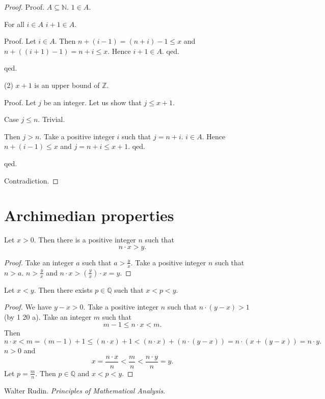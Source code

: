 \documentclass{article}
\begin{document}
\begin{forthel}
\begin{proof}
Proof.
$A \subseteq \mathbb{N}$.
$1 \in A$.

For all $i \in A$ $i + 1 \in A$.

  Proof. Let $i \in A$. Then
  $n + (i -1) = (n + i) - 1 \leq x$ and
  $n + ((i + 1) - 1) = n + i \leq x$.
  Hence $i + 1 \in A$.
  qed.

qed.

(2) $x + 1$ is an upper bound of $\mathbb{Z}$.

Proof.
Let $j$ be an integer. Let us show that $j \leq x + 1$.

Case $j \leq n$. Trivial.

Then $j > n$. Take a positive integer $i$
such that $j = n + i$. $i \in A$.
Hence $n + (i-1) \leq x$ and $j = n+i \leq x + 1$.
qed.

qed.

Contradiction.
\end{proof}


\end{forthel}
\section{Archimedian properties}

\begin{forthel}
\begin{theorem}[1 20 a] Let $x > 0$. Then there is a 
positive integer $n$ such that $$n \cdot x > y.$$ \end{theorem}

\begin{proof} Take an integer $a$ such that $a > \frac{y}{x}$.
Take a positive integer $n$ such that $n > a$.
$n > \frac{y}{x}$ and $n \cdot x > (\frac{y}{x}) \cdot x = y$.
\end{proof}


\begin{theorem}[1 20 b] Let $x < y$. Then there exists 
$p \in \mathbb{Q}$ such that $x < p < y$. \end{theorem}
\begin{proof} We have $y - x > 0$.
Take a positive integer $n$ such that 
$n\cdot (y-x) > 1$ (by 1 20 a).
Take an integer $m$ such that
$$m -1 \leq n \cdot x < m.$$
Then
$$n \cdot x < m = (m - 1) + 1 \leq (n\cdot x) + 1 < 
(n\cdot x) + (n\cdot (y-x)) = n \cdot (x + (y - x)) = n \cdot y.$$
$n > 0$ and
$$x = \frac{n\cdot x}{n} < \frac{m}{n} < \frac{n\cdot y}{n} = y.$$
Let $p = \frac{m}{n}$. Then $p \in \mathbb{Q}$ and $x < p < y$.
\end{proof}
\end{forthel}

\begin{thebibliography}{plain}
 Walter Rudin. \textit{Principles of Mathematical
Analysis}.

\end{thebibliography}
\end{document}
